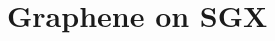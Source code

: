 \chapter{Graphene on SGX}
\label{chap:sgx}

\makeatletter
{}
\makeatother
\graphicspath{{sgx/figures/}}



%






\makeatletter
{}
\makeatother
\graphicspath{{}}